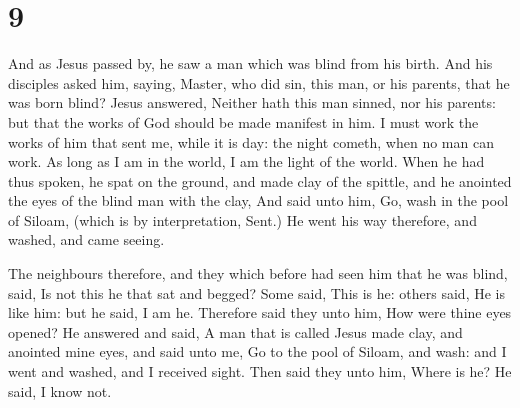 \hypertarget{section-8}{%
\section{9}\label{section-8}}

 And as Jesus passed by, he saw a man which was blind from
his birth.  And his disciples asked him, saying, Master, who
did sin, this man, or his parents, that he was born blind? 
Jesus answered, Neither hath this man sinned, nor his parents: but that
the works of God should be made manifest in him.  I must
work the works of him that sent me, while it is day: the night cometh,
when no man can work.  As long as I am in the world, I am
the light of the world.  When he had thus spoken, he spat on
the ground, and made clay of the spittle, and he anointed the eyes of
the blind man with the clay,  And said unto him, Go, wash in
the pool of Siloam, (which is by interpretation, Sent.) He went his way
therefore, and washed, and came seeing.

 The neighbours therefore, and they which before had seen
him that he was blind, said, Is not this he that sat and begged?
 Some said, This is he: others said, He is like him: but he
said, I am he.  Therefore said they unto him, How were
thine eyes opened?  He answered and said, A man that is
called Jesus made clay, and anointed mine eyes, and said unto me, Go to
the pool of Siloam, and wash: and I went and washed, and I received
sight.  Then said they unto him, Where is he? He said, I
know not.

